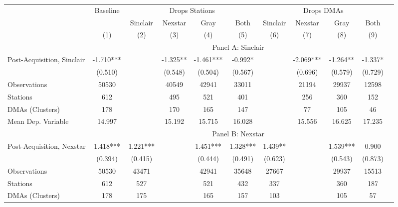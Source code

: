 {\def \sym#1{\ifmmode^{#1}\else\(^{#1}\)\fi} \begin{tabular}{l*{10}{c}} \toprule \ & \multicolumn{1}{c}{Baseline} & \multicolumn{4}{c}{Drops Stations}   & \multicolumn{4}{c}{Drops DMAs} \\ \cmidrule(lr){2-2}\cmidrule(lr){3-6}\cmidrule(lr){7-10} \ & 
 & Sinclair & Nexstar & Gray & Both & Sinclair & Nexstar & Gray & Both \\  \ & (1) & (2) & (3) & (4) & (5) & (6)  & (7)  & (8)  & (9) \\
\midrule \ & \multicolumn{9}{c}{Panel A: Sinclair} \\\cmidrule(lr){2-10}
Post-Acquisition, Sinclair&   -1.710***&         &   -1.325** &   -1.461***&   -0.992*  &         &   -2.069***&   -1.264** &   -1.337*  \\
                &  (0.510)   &         &  (0.548)   &  (0.504)   &  (0.567)   &         &  (0.696)   &  (0.579)   &  (0.729)   \\
\midrule
Observations    &    50530   &         &    40549   &    42941   &    33011   &         &    21194   &    29937   &    12598   \\
Stations        &      612   &         &      495   &      521   &      401   &         &      256   &      360   &      152   \\
DMAs (Clusters) &      178   &         &      170   &      165   &      147   &         &       77   &      105   &       46   \\
Mean Dep. Variable&   14.997   &         &   15.192   &   15.715   &   16.028   &         &   15.556   &   16.625   &   17.235   \\
\midrule \ & \multicolumn{9}{c}{Panel B: Nexstar} \\\cmidrule(lr){2-10}
Post-Acquisition, Nexstar&    1.418***&    1.221***&         &    1.451***&    1.328***&    1.439** &         &    1.539***&    0.900   \\
                &  (0.394)   &  (0.415)   &         &  (0.444)   &  (0.491)   &  (0.623)   &         &  (0.543)   &  (0.873)   \\
\midrule
Observations    &    50530   &    43471   &         &    42941   &    35648   &    27667   &         &    29937   &    15513   \\
Stations        &      612   &      527   &         &      521   &      432   &      337   &         &      360   &      187   \\
DMAs (Clusters) &      178   &      175   &         &      165   &      157   &      103   &         &      105   &       57   \\

\end{tabular}}
